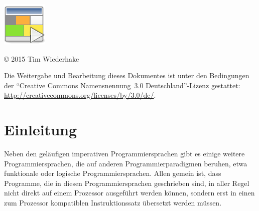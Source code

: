 \documentclass[german, a4paper, parskip, bibliography=totoc]{scrartcl}
\author     {\myAuthor}
\title      {\myTitle}
\subtitle   {\mySubtitle}
\date       {\myDate}
\begin{document}
\maketitle

\begin{abstract}
    \noindent JumpVM ist die \enquote{Java Unified Multi Paradigm Virtual
    Machine}: Grafische Oberfläche, Parser, Compiler und Virtuelle Maschine für
    einige verschiedene Programmiersprachen und Programmierparadigmen. Das
    Hauptziel dieser Software ist es, die Vorlesungen \enquote{Einführung in
    den Übersetzerbau} und \enquote{Übersetzung fortgeschrittener
    Sprachkonzepte} an der Universität Ulm zu unterstützen. Die Namen und
    Fähigkeiten der verschiedenen unterstützten Programmiersprachen lehnen sich
    an das Buch \enquote{Übersetzerbau: Theorie, Konstruktion, Generierung}~
    \cite{compilerbau} von R.~Wilhelm und D.~Maurer an, das in den genannten
    Vorlesungen verwendet wird.
\end{abstract}

\vfill{}
\begin{center}
    \includegraphics[scale=3]{logo.pdf}
\end{center}

\clearpage{}
\tableofcontents{}
\vfill{}
\copyright{} 2015 Tim Wiederhake

Die Weitergabe und Bearbeitung dieses Dokumentes ist unter den Bedingungen der
\enquote{Creative Commons Namensnennung~3.0 Deutschland}-Lizenz gestattet:\\
\href{http://creativecommons.org/licenses/by/3.0/de/}
{http://creativecommons.org/licenses/by/3.0/de/}.
\clearpage{}


\section{Einleitung}
Neben den geläufigen imperativen Programmiersprachen gibt es einige weitere
Programmiersprachen, die auf anderen Programmierparadigmen beruhen, etwa
funktionale oder logische Programmiersprachen. Allen gemein ist, dass
Programme, die in diesen Programmiersprachen geschrieben sind, in aller Regel
nicht direkt auf einem Prozessor ausgeführt werden können, sondern erst in
einen zum Prozessor kompatiblen Instruktionssatz übersetzt werden müssen.
\end{document}
